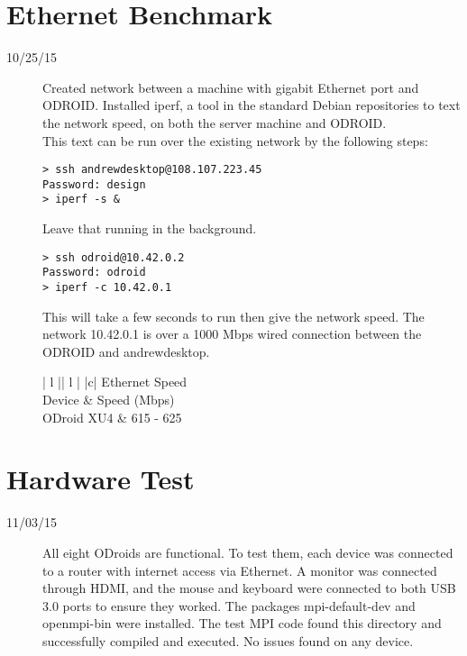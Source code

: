 \section{Ethernet Benchmark}
\begin{description}
\item [10/25/15] Created network between a machine with gigabit Ethernet port and ODROID. Installed iperf, a tool in the standard Debian repositories to text the network speed, on both the server machine and ODROID. \\

This text can be run over the existing network by the following steps:
\begin{lstlisting}
> ssh andrewdesktop@108.107.223.45 
Password: design 
> iperf -s &
\end{lstlisting}
Leave that running in the background.
\begin{lstlisting}
> ssh odroid@10.42.0.2
Password: odroid
> iperf -c 10.42.0.1
\end{lstlisting}
This will take a few seconds to run then give the network speed. The network 10.42.0.1 is over a 1000 Mbps wired connection between the ODROID and andrewdesktop. \\

\begin{center}
\begin{tabular}{ | l || l | }
\hline
{}
{ |c| }{ Ethernet Speed } \\
\hline
Device & Speed (Mbps) \\
\hline
ODroid XU4 & 615 - 625 \\
\hline
\end{tabular}
\end{center}

\end{description}

\section{Hardware Test}
\begin{description}
\item [11/03/15] All eight ODroids are functional. To test them, each device was connected to a router with internet access via Ethernet. A monitor was connected through HDMI, and the mouse and keyboard were connected to both USB 3.0 ports to ensure they worked. The packages mpi-default-dev and openmpi-bin were installed. The test MPI code found this directory and successfully compiled and executed. No issues found on any device. \\
\end{description}

